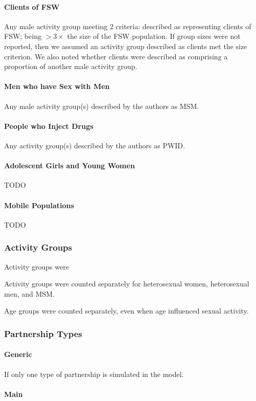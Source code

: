 \paragraph{Clients of FSW}
Any male activity group meeting 2 criteria:
described as representing clients of FSW;
being ${> 3 \times}$ the size of the FSW population.
If group sizes were not reported,
then we assumed an activity group described as clients met the size criterion.
We also noted whether clients were described as
comprising a proportion of another male activity group.
\paragraph{Men who have Sex with Men}
Any male activity group(s) described by the authors as MSM.
\paragraph{People who Inject Drugs}
Any activity group(s) described by the authors as PWID.
\paragraph{Adolescent Girls and Young Women}
TODO
\paragraph{Mobile Populations}
TODO
\subsubsection{Activity Groups}
Activity groups were 

Activity groups were counted separately for
heterosexual women, heterosexual men, and MSM.

Age groups were counted separately, even when age influenced sexual activity.
\subsubsection{Partnership Types}
\label{aaa:defs:pt}
\paragraph{Generic}
If only one type of partnership is simulated in the model.
\paragraph{Main}

